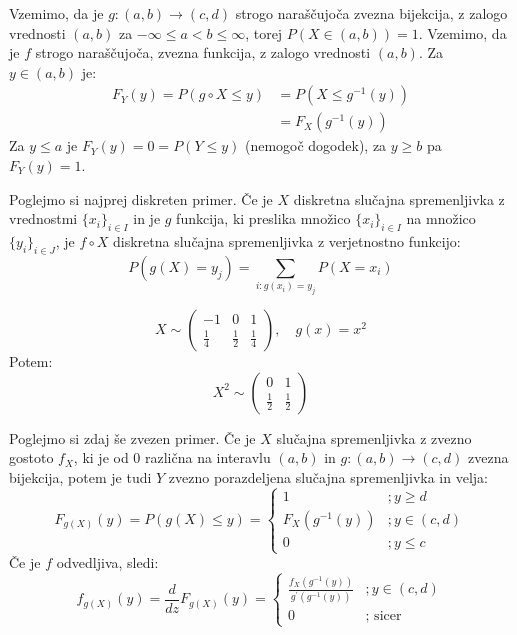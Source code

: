 \documentclass[12pt]{book}
\def\n{\noindent}
\theoremstyle{definition}
\theoremstyle{plain}
\theoremstyle{plain}
\theoremstyle{plain}
\theoremstyle{remark}
\begin{document}
\n Vzemimo, da je $g:(a, b) \to (c,d)$ strogo naraščujoča zvezna bijekcija, z zalogo vrednosti $(a, b)$ za $-\infty \leq a<b \leq \infty$, torej $P(X \in(a, b))=1$. Vzemimo, da je $f$ strogo naraščujoča, zvezna funkcija, z zalogo vrednosti $(a, b)$. Za $y \in (a, b)$ je: 
$$
\begin{aligned}
    F_Y(y)=P(g \circ X \leq y)&=P\left(X \leq g^{-1}(y)\right) \\
    &=F_X\left(g^{-1}(y)\right)
\end{aligned}
$$
Za $y \leq a$ je $F_Y(y)=0=P(Y \leq y)$ (nemogoč dogodek), za $y \geq b$ pa $F_Y(y)=1$.

\n Poglejmo si najprej diskreten primer. Če je $X$ diskretna slučajna spremenljivka z vrednostmi $\{x_i\}_{i \in I}$ in je $g$ funkcija, ki preslika množico $\{x_i\}_{i \in I}$ na množico $\{y_i\}_{i \in J}$, je $f \circ X$ diskretna slučajna spremenljivka z verjetnostno funkcijo:
$$
P\left(g(X)=y_j\right)=\sum_{i: g\left(x_i\right)=y_j} P\left(X=x_i\right)
$$

\begin{zgled}
    $$
    X \sim\left(\begin{array}{ccc}
        -1 & 0 & 1 \\
        \frac{1}{4} & \frac{1}{2} & \frac{1}{4}
        \end{array}\right), \quad  g(x)=x^2
    $$
    Potem: 
    $$
    X^2 \sim \left(\begin{array}{cc}
        0 & 1 \\
        \frac{1}{2} & \frac{1}{2}
        \end{array}\right)
    $$
    \vspace{-4pt}
\end{zgled}

\n Poglejmo si zdaj še zvezen primer. Če je $X$ slučajna spremenljivka z zvezno gostoto $f_X$, ki je od $0$ različna na interavlu $(a,b)$ in $g:(a,b) \to (c,d)$ zvezna bijekcija, potem je tudi $Y$ zvezno porazdeljena slučajna spremenljivka in velja: 
$$
F_{g(X)}(y)=P(g(X) \leq y)=\begin{cases} 1  &; y \geq d \\
    F_X\left(g^{-1}(y)\right) &; y \in(c, d) \\
    0 &; y \leq c \end{cases}
$$
Če je $f$ odvedljiva, sledi: 
$$
f_{g(X)}(y)=\frac{d}{d z} F_{g(X)}(y)=\begin{cases}
    \frac{f_X\left(g^{-1}(y)\right)}{g^{\prime}\left(g^{-1}(y)\right)} &; y \in(c, d) \\
    0 &; \text { sicer }
    \end{cases}
$$
\end{document}
